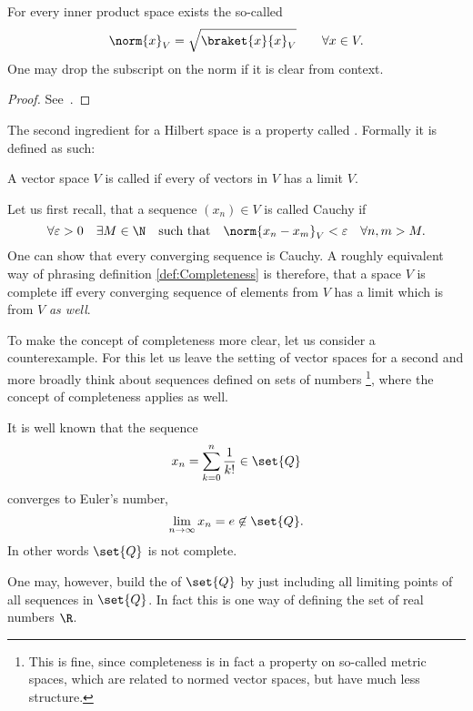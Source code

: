 \begin{prop}
	For every inner product space exists the so-called 
	\begin{equation}
		\norm{x}_V = \sqrt{ \braket{x}{x}_V } \qquad \forall x \in V.
		\label{eqn:normInduced}
	\end{equation}
	One may drop the subscript on the norm
	if it is clear from context.
	\begin{proof}
		See~\cite{DiracNotation}.
	\end{proof}
\end{prop}

The second ingredient for a Hilbert space is a property
called . Formally it is defined as such:
\begin{defn}
	\label{def:Completeness}
	A vector space $V$ is called  if every
	 of vectors in $V$ has a limit $V$.
\end{defn}
Let us first recall, that a sequence $(x_n) \in V$ is called Cauchy if
\[ \forall \varepsilon > 0 \quad
	\exists M \in \N \quad \text{such that} \quad
	\norm{x_n - x_m}_V < \varepsilon \quad \forall n,m > M.
\]
One can show that every converging sequence is Cauchy.
A roughly equivalent way of phrasing definition \vref{def:Completeness}
is therefore,
that a space $V$ is complete iff every converging sequence
of elements from $V$ has a limit which is from $V$ \emph{as well}.

\begin{exmp}
	\label{exmp:QdenseR}
	To make the concept of completeness more clear,
	let us consider a counterexample.
	For this let us leave the setting of vector spaces for a second
	and more broadly think about sequences defined on sets of numbers%
	\footnote{This is fine, since completeness is in fact a property on
		so-called metric spaces, which are related to normed vector
		spaces, but have much less structure.},
	where the concept of completeness applies as well.

	\noindent
	It is well known that the sequence
	\[ x_n = \sum_{k=0}^n \frac{1}{k!} \in \set{Q} \]
	converges to Euler's number, \ie
	\[ \lim_{n\to\infty} x_n = e \not\in \set{Q}. \]
	In other words $\set{Q}$ is not complete.

	One may, however, build the  of $\set{Q}$
	by just including all limiting points of all sequences in $\set{Q}$.
	In fact this is one way of defining the set of real numbers $\R$.
\end{exmp}

